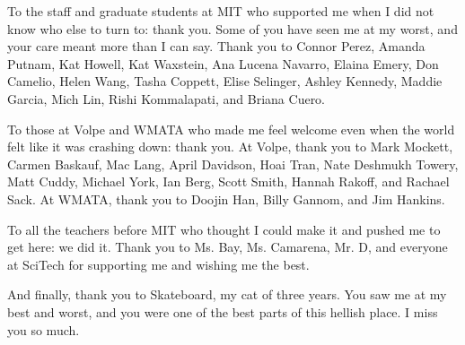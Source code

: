 To the staff and graduate students at MIT who supported me when I did not know who else to turn to: thank you. Some of you have seen me at my worst, and your care meant more than I can say. Thank you to Connor Perez, Amanda Putnam, Kat Howell, Kat Waxstein, Ana Lucena Navarro, Elaina Emery, Don Camelio, Helen Wang, Tasha Coppett, Elise Selinger, Ashley Kennedy, Maddie Garcia, Mich Lin, Rishi Kommalapati, and Briana Cuero.

To those at Volpe and WMATA who made me feel welcome even when the world felt like it was crashing down: thank you. At Volpe, thank you to Mark Mockett, Carmen Baskauf, Mac Lang, April Davidson, Hoai Tran, Nate Deshmukh Towery, Matt Cuddy, Michael York, Ian Berg, Scott Smith, Hannah Rakoff, and Rachael Sack. At WMATA, thank you to Doojin Han, Billy Gannom, and Jim Hankins.

To all the teachers before MIT who thought I could make it and pushed me to get here: we did it. Thank you to Ms. Bay, Ms. Camarena, Mr. D, and everyone at SciTech for supporting me and wishing me the best.

And finally, thank you to Skateboard, my cat of three years. You saw me at my best and worst, and you were one of the best parts of this hellish place. I miss you so much.
